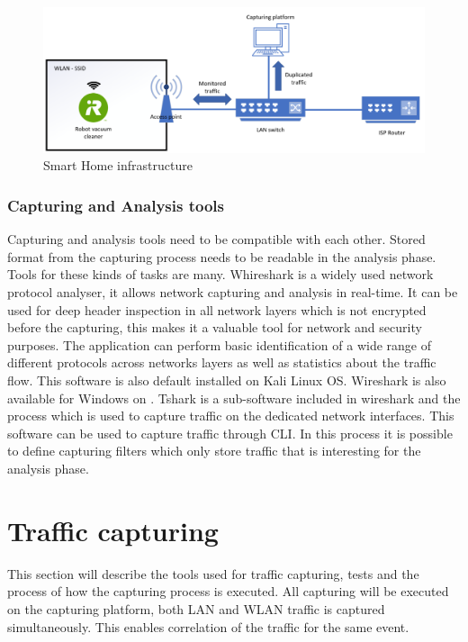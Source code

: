\begin{figure}[H]
    \centering
    \includegraphics[width=\textwidth]{figures/WLAN_LAN_setup.png}
    \caption{Smart Home infrastructure}
    \label{fig:WLAN_LAN_setup}
\end{figure}



\subsubsection{Capturing and Analysis tools}
Capturing and analysis tools need to be compatible with each other. Stored format from the capturing process needs to be readable in the analysis phase. Tools for these kinds of tasks are many. Whireshark is a widely used network protocol analyser, it allows network capturing and analysis in real-time. It can be used for deep header inspection in all network layers which is not encrypted before the capturing, this makes it a valuable tool for network and security purposes. The application can perform basic identification of a wide range of different protocols across networks layers as well as statistics about the traffic flow. This software is also default installed on Kali Linux OS. Wireshark is also available for Windows on \cite{wireshark_download_2016}.
Tshark is a sub-software included in wireshark and the process which is used to capture traffic on the dedicated network interfaces. This software can be used to capture traffic through CLI. In this process it is possible to define capturing filters which only store traffic that is interesting for the analysis phase.


\section{Traffic capturing}
This section will describe the tools used for traffic capturing, tests and the process of how the capturing process is executed. All capturing will be executed on the capturing platform, both LAN and WLAN traffic is captured simultaneously. This enables correlation of the traffic for the same event.  

